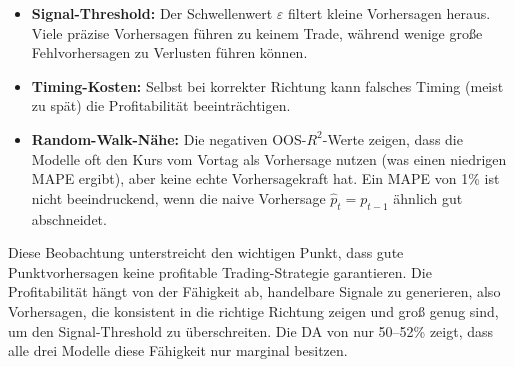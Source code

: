 \begin{itemize}
    \item \textbf{Signal-Threshold:} Der Schwellenwert $\varepsilon$ filtert kleine Vorhersagen heraus. Viele präzise Vorhersagen führen zu keinem Trade, während wenige große Fehlvorhersagen zu Verlusten führen können.
    \item \textbf{Timing-Kosten:} Selbst bei korrekter Richtung kann falsches Timing (meist zu spät) die Profitabilität beeinträchtigen.
    \item \textbf{Random-Walk-Nähe:} Die negativen OOS-$R^2$-Werte zeigen, dass die Modelle oft den Kurs vom Vortag als Vorhersage nutzen (was einen niedrigen \ac{MAPE} ergibt), aber keine echte Vorhersagekraft hat. Ein \ac{MAPE} von 1\% ist nicht beeindruckend, wenn die naive Vorhersage $\hat{p}_t = p_{t-1}$ ähnlich gut abschneidet.
\end{itemize}

Diese Beobachtung unterstreicht den wichtigen Punkt, dass gute Punktvorhersagen keine profitable Trading-Strategie garantieren. Die Profitabilität hängt von der Fähigkeit ab, handelbare Signale zu generieren, also Vorhersagen, die konsistent in die richtige Richtung zeigen und groß genug sind, um den Signal-Threshold zu überschreiten. Die \ac{DA} von nur 50--52\% zeigt, dass alle drei Modelle diese Fähigkeit nur marginal besitzen.
